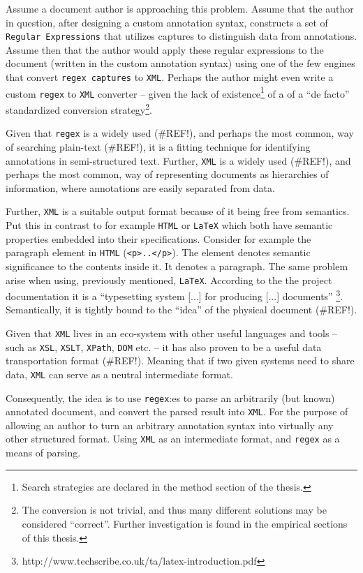 \documentclass{scrreprt}
\begin{document}
Assume a document author is approaching this problem. Assume that the author in question, after designing a custom annotation syntax, constructs a set of \texttt{Regular Expressions} that utilizes captures to distinguish data from annotations. Assume then that the author would apply these regular expressions to the document (written in the custom annotation syntax)  using one of the few engines that convert \texttt{regex captures} to \texttt{XML}. Perhaps the author might even write a custom \texttt{regex} to \texttt{XML} converter -- given the lack of existence\footnote{ Search strategies are declared in the method section of the thesis.} of a of a ``de facto'' standardized conversion strategy\footnote{ The conversion is not trivial, and thus many different solutions may be considered ``correct''. Further investigation is found in the empirical sections of this thesis.}.

Given that \texttt{regex} is a widely used (\#REF!), and perhaps the most common, way of searching plain-text (\#REF!), it is a fitting technique for identifying annotations in semi-structured text. Further, \texttt{XML} is a widely used (\#REF!), and perhaps the most common, way of representing documents as hierarchies of information, where annotations are easily separated from data.

Further, \texttt{XML} is a suitable output format because of it being free from semantics. Put this in contrast to for example \texttt{HTML} or \texttt{LaTeX} which both have semantic properties embedded into their specifications. Consider for example the paragraph element in \texttt{HTML} (\texttt{<p>..</p>}). The element denotes semantic significance to the contents inside it. It denotes a paragraph. The same problem arise when using, previously mentioned, \texttt{LaTeX}. According to the the project documentation it is a ``typesetting system [...] for producing [...] documents'' \footnote{ http://www.techscribe.co.uk/ta/latex-introduction.pdf}. Semantically, it is tightly bound to the ``idea'' of the physical document (\#REF!). 

Given that \texttt{XML} lives in an eco-system with other useful languages and tools -- such as \texttt{XSL}, \texttt{XSLT}, \texttt{XPath}, \texttt{DOM} etc. -- it has also proven to be a useful data transportation format (\#REF!). Meaning that if two given systems need to share data, \texttt{XML} can serve as a neutral intermediate format.

Consequently, the idea is to use \texttt{regex}:es to parse an arbitrarily (but known) annotated document, and convert the parsed result into \texttt{XML}. For the purpose of allowing an author to turn an arbitrary annotation syntax into virtually any other structured format. Using \texttt{XML} as an intermediate format, and \texttt{regex} as a means of parsing.
\end{document}
